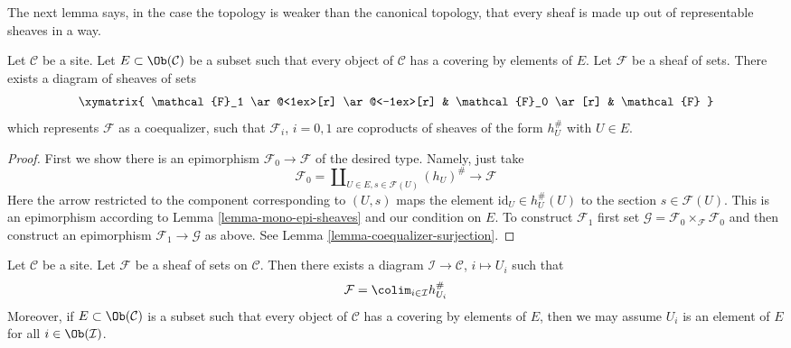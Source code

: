 \noindent
The next lemma says, in the case the topology is weaker than the
canonical topology, that every sheaf is made up out of
representable sheaves in a way.

\begin{lemma}
\label{lemma-sheaf-coequalizer-representable}
Let $\mathcal{C}$ be a site. Let $E \subset \Ob(\mathcal{C})$ be a
subset such that every object of $\mathcal{C}$ has a covering by
elements of $E$. Let $\mathcal{F}$ be a sheaf of sets. There exists a
diagram of sheaves of sets
$$
\xymatrix{
\mathcal{F}_1 \ar@<1ex>[r] \ar@<-1ex>[r] &
\mathcal{F}_0 \ar[r] &
\mathcal{F}
}
$$
which represents $\mathcal{F}$ as a coequalizer,
such that $\mathcal{F}_i$, $i = 0, 1$ are coproducts
of sheaves of the form $h_U^\#$ with $U \in E$.
\end{lemma}

\begin{proof}
First we show there is an epimorphism $\mathcal{F}_0 \to \mathcal{F}$
of the desired type. Namely, just take
$$
\mathcal{F}_0 =
\coprod\nolimits_{U \in E, s \in \mathcal{F}(U)}
(h_U)^\# \longrightarrow \mathcal{F}
$$
Here the arrow restricted to the component corresponding to $(U, s)$ maps
the element $\text{id}_U \in h_U^\#(U)$ to the section $s \in \mathcal{F}(U)$.
This is an epimorphism according to Lemma \ref{lemma-mono-epi-sheaves} and
our condition on $E$. To construct $\mathcal{F}_1$ first set
$\mathcal{G} = \mathcal{F}_0 \times_\mathcal{F} \mathcal{F}_0$ and
then construct an epimorphism $\mathcal{F}_1 \to \mathcal{G}$
as above. See Lemma \ref{lemma-coequalizer-surjection}.
\end{proof}

\begin{lemma}
\label{lemma-colimit-representable}
Let $\mathcal{C}$ be a site. Let $\mathcal{F}$ be a sheaf of sets on
$\mathcal{C}$. Then there exists a diagram $\mathcal{I} \to \mathcal{C}$,
$i \mapsto U_i$ such that
$$
\mathcal{F} = \colim_{i \in \mathcal{I}} h_{U_i}^\#
$$
Moreover, if $E \subset \Ob(\mathcal{C})$ is a subset such that every
object of $\mathcal{C}$ has a covering by elements of $E$, then we may
assume $U_i$ is an element of $E$ for all $i \in \Ob(\mathcal{I})$.
\end{lemma}

